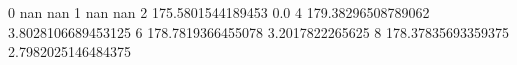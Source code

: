 0 nan nan
1 nan nan
2 175.5801544189453 0.0
4 179.38296508789062 3.8028106689453125
6 178.7819366455078 3.2017822265625
8 178.37835693359375 2.7982025146484375
